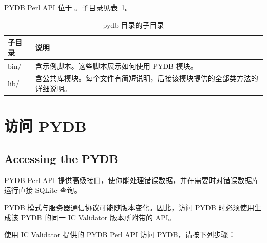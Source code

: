 PYDB Perl API 位于 。子目录见表~\ref{tab:app-e-pydb-dirs}。

\begin{table}[htbp]
\centering
\caption{pydb 目录的子目录}
\label{tab:app-e-pydb-dirs}
\begin{tabular}{@{}>{\ttfamily\raggedright\arraybackslash}p{} p{}@{}}
\toprule
\textbf{\rmfamily 子目录} & \textbf{说明} \\
\midrule
bin/ &
含示例脚本。这些脚本展示如何使用 PYDB 模块。 \\
\midrule
lib/ &
含公共库模块。每个文件有简短说明，后接该模块提供的全部类方法的详细说明。 \\
\bottomrule
\end{tabular}
\end{table}

\section{访问 PYDB}
\subsection*{Accessing the PYDB}

PYDB Perl API 提供高级接口，使你能处理错误数据，并在需要时对错误数据库运行直接 SQLite 查询。

\begin{noteBox}
PYDB 模式与服务器通信协议可能随版本变化。因此，访问 PYDB 时必须使用生成该 PYDB 的同一 IC Validator 版本所附带的 API。
\end{noteBox}

使用 IC Validator 提供的 PYDB Perl API 访问 PYDB，请按下列步骤：


